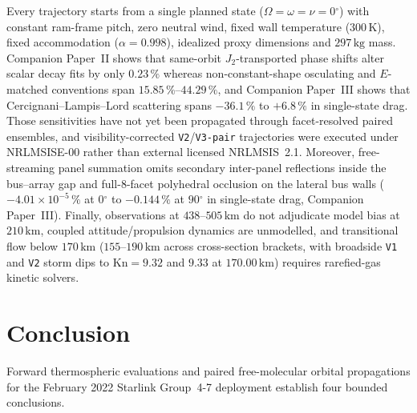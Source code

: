 \documentclass[12pt]{article}
\newcommand{\unit}[1]{\,\mathrm{#1}}
\newcommand{\degree}{\ensuremath{{}^\circ}}
\begin{document}
Every trajectory starts from a single planned state ($\Omega=\omega=\nu=0\degree$) with constant ram-frame pitch, zero neutral wind, fixed wall temperature ($300\unit{K}$), fixed accommodation ($\alpha=0.998$), idealized proxy dimensions and $297\unit{kg}$ mass. Companion Paper~II shows that same-orbit $J_2$-transported phase shifts alter scalar decay fits by only $0.23\,\%$ whereas non-constant-shape osculating and $E$-matched conventions span $15.85\,\%$--$44.29\,\%$, and Companion Paper~III shows that Cercignani--Lampis--Lord scattering spans $-36.1\,\%$ to $+6.8\,\%$ in single-state drag. Those sensitivities have not yet been propagated through facet-resolved paired ensembles, and visibility-corrected \texttt{V2}/\texttt{V3-pair} trajectories were executed under NRLMSISE-00 rather than external licensed NRLMSIS~2.1. Moreover, free-streaming panel summation omits secondary inter-panel reflections inside the bus--array gap and full-8-facet polyhedral occlusion on the lateral bus walls ($-4.01\times10^{-5}\,\%$ at $0\degree$ to $-0.144\,\%$ at $90\degree$ in single-state drag, Companion Paper~III). Finally, observations at $438$--$505\unit{km}$ do not adjudicate model bias at $210\unit{km}$, coupled attitude/propulsion dynamics are unmodelled, and transitional flow below $170\unit{km}$ ($155$--$190\unit{km}$ across cross-section brackets, with broadside \texttt{V1} and \texttt{V2} storm dips to $\mathrm{Kn} = 9.32$ and $9.33$ at $170.00\unit{km}$) requires rarefied-gas kinetic solvers.

\section{Conclusion}
\label{sec:conclusions}

Forward thermospheric evaluations and paired free-molecular orbital propagations for the February 2022 Starlink Group~4-7 deployment establish four bounded conclusions.
\end{document}
